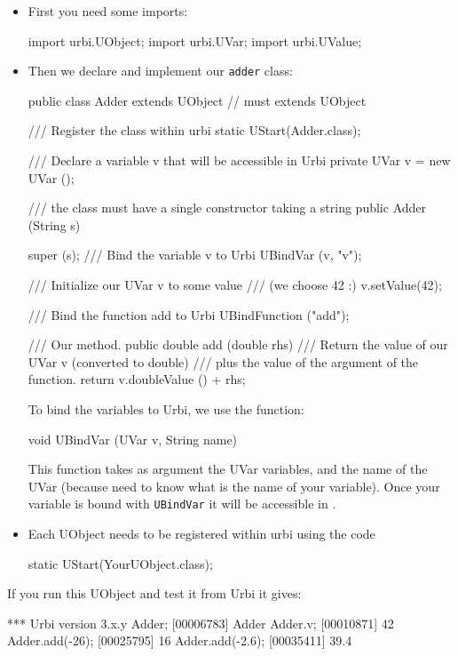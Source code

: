 \begin{itemize}
\item First you need some imports:

\begin{java}
import urbi.UObject;
import urbi.UVar;
import urbi.UValue;
\end{java}

\item Then we declare and implement our \lstinline{adder} class:
\begin{java}
public class Adder extends UObject // must extends UObject
{
  /// Register the class within urbi
  static { UStart(Adder.class); }

  /// Declare a variable v that will be accessible in Urbi
  private UVar v = new UVar ();

  /// the class must have a single constructor taking a string
  public Adder (String s)
  {
    super (s);
    /// Bind the variable v to Urbi
    UBindVar (v, "v");

    /// Initialize our UVar v to some value
    /// (we choose 42 :)
    v.setValue(42);

    /// Bind the function add to Urbi
    UBindFunction ("add");
  }

  /// Our method.
  public double add (double rhs)
  {
    /// Return the value of our UVar v (converted to double)
    /// plus the value of the argument of the function.
    return v.doubleValue () + rhs;
  }
}
\end{java}

To bind the variables to Urbi, we use the function:
\begin{java}
void UBindVar (UVar v, String name)
\end{java}

This function takes as argument the UVar variables, and the name of the UVar
(because \urbi need to know what is the name of your variable).  Once your
variable is bound with \lstinline{UBindVar} it will be accessible in \urbi.

\item Each UObject needs to be registered within urbi using the code
\begin{java}
static { UStart(YourUObject.class); }
\end{java}
\end{itemize}

If you run this UObject and test it from Urbi it gives:

\begin{urbiunchecked}
[00000102] *** Urbi version 3.x.y
Adder;
[00006783] Adder
Adder.v;
[00010871] 42
Adder.add(-26);
[00025795] 16
Adder.add(-2.6);
[00035411] 39.4
\end{urbiunchecked}


